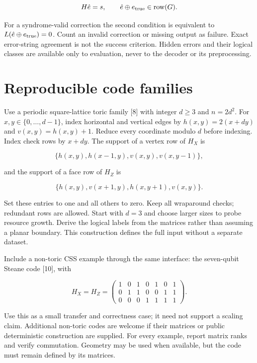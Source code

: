 \documentclass[11pt,letterpaper]{article}
\begin{document}
\[H\hat e=s,\qquad \hat e\oplus e_{\rm true}\in\operatorname{row}(G).\]

For a syndrome-valid correction the second condition is equivalent to $L(\hat e\oplus e_{\rm true})=0$. Count an invalid correction or missing output as failure. Exact error-string agreement is not the success criterion. Hidden errors and their logical classes are available only to evaluation, never to the decoder or its preprocessing.\par

\section{Reproducible code families}

Use a periodic square-lattice toric family [8] with integer $d\geq3$ and $n=2d^2$. For $x,y\in\{0,\ldots,d-1\}$, index horizontal and vertical edges by $h(x,y)=2(x+dy)$ and $v(x,y)=h(x,y)+1$. Reduce every coordinate modulo $d$ before indexing. Index check rows by $x+dy$. The support of a vertex row of $H_X$ is\par

\[\{h(x,y),h(x-1,y),v(x,y),v(x,y-1)\},\]

and the support of a face row of $H_Z$ is\par

\[\{h(x,y),v(x+1,y),h(x,y+1),v(x,y)\}.\]

Set these entries to one and all others to zero. Keep all wraparound checks; redundant rows are allowed. Start with $d=3$ and choose larger sizes to probe resource growth. Derive the logical labels from the matrices rather than assuming a planar boundary. This construction defines the full input without a separate dataset.\par

Include a non-toric CSS example through the same interface: the seven-qubit Steane code [10], with\par

\[H_X=H_Z=\begin{pmatrix}1&0&1&0&1&0&1\\0&1&1&0&0&1&1\\0&0&0&1&1&1&1\end{pmatrix}.\]

Use this as a small transfer and correctness case; it need not support a scaling claim. Additional non-toric codes are welcome if their matrices or public deterministic construction are supplied. For every example, report matrix ranks and verify commutation. Geometry may be used when available, but the code must remain defined by its matrices.\par
\end{document}
